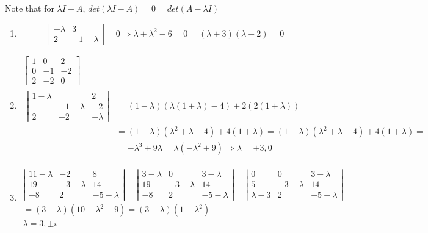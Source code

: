 \documentclass[twoside]{amsart}
\theoremstyle{plain}
\theoremstyle{definition}
\newcommand{\exercisehead}[1]
  {
   \noindent{\small\bf Exercise #1.}
   \smallskip}
\begin{document}
\exercisehead{3} Note that for $\lambda I - A$, $det{(\lambda I - A) } = 0 = det{(A - \lambda I)}$ \begin{enumerate}
\item \[
\left| \begin{matrix} - \lambda & 3 \\ 2 & -1 - \lambda \end{matrix} \right| = 0 \Longrightarrow \lambda + \lambda^2 - 6 = 0 = (\lambda + 3)(\lambda - 2) = 0
\]
\item \[
\begin{gathered}
  \left[ \begin{matrix} 1 & 0 & 2 \\ 0 & -1 & -2 \\ 2 & -2 & 0 \end{matrix} \right]  \\
  \begin{aligned}
  \left| \begin{matrix} 1 - \lambda & & 2 \\ & -1 -\lambda & -2 \\ 2 & -2 & -\lambda \end{matrix} \right| & = (1-\lambda) (\lambda ( 1 + \lambda ) -4 ) + 2 ( 2 (1+ \lambda ) ) = \\
  & = (1 - \lambda ) ( \lambda^2 + \lambda - 4) + 4 (1 + \lambda ) = (1- \lambda) ( \lambda^2 + \lambda - 4) + 4 (1+ \lambda ) = \\
  & = -\lambda^3 + 9 \lambda = \lambda ( -\lambda^2 + 9) \Longrightarrow \boxed{ \lambda = \pm 3, 0 }
\end{aligned}
\end{gathered}
\]
\item \[
\begin{gathered}
\left| \begin{matrix} 11 - \lambda & -2 & 8 \\ 19 & -3-\lambda & 14 \\ -8 & 2 & -5 - \lambda \end{matrix} \right| = \left| \begin{matrix} 3 - \lambda & 0 & 3 - \lambda \\ 19 & -3 -\lambda & 14 \\ -8 & 2 & -5 - \lambda \end{matrix} \right| = \left| \begin{matrix} 0 & 0 & 3 - \lambda \\ 5 & -3 - \lambda & 14 \\ \lambda - 3 & 2 & -5 - \lambda \end{matrix} \right| \\ 
= (3- \lambda ) (10 + \lambda^2 - 9 ) = (3-\lambda ) (1 + \lambda^2) \\
\boxed{ \lambda = 3 , \pm i }
\end{gathered}
\]
\end{enumerate}
\end{document}
